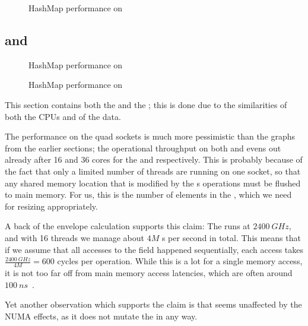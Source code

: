 \begin{figure}[ht]
  \centering
  \caption{HashMap performance on \scaleway}
\end{figure}


\clearpage
\subsection{\mitserver{} and \daslab{}}

\begin{figure}[ht]
  \begin{minipage}[h]{\linewidth}
    \centering
    \caption{HashMap performance on \mitserver{}}
  \end{minipage}
  \begin{minipage}[h]{\linewidth}
    \centering
    \caption{HashMap performance on \daslab{}}
  \end{minipage}
\end{figure}

This section contains both the \mitserver{} and the \daslab{}; this is done due to the similarities
of both the CPUs and of the data.

The  performance on the quad sockets is much more pessimistic than the graphs from
the earlier sections; the operational throughput on both  and  evens out
already after 16 and 36 cores for the \mitserver{} and \daslab{} respectively. This is probably
because of the fact that only a limited number of threads are running on one socket, so that any
shared memory location that is modified by the s operations must be flushed to main
memory. For us, this is the number of elements in the , which we need for resizing
appropriately.

A back of the envelope calculation supports this claim: The \mitserver{} runs at $\SI{2400}{GHz}$,
and with 16 threads we manage about $4M$ s per second in total. This means that if we
assume that all accesses to the  field happened sequentially, each access takes
$\frac{\SI{2400}{GHz}}{4M} = 600$ cycles per operation. While this is a lot for a single memory
access, it is not too far off from main memory access latencies, which are often around
$\SI{100}{ns}$~\cite{memlatency}.

Yet another observation which supports the claim is that  seems unaffected by the
NUMA effects, as it does not mutate the  in any way.



